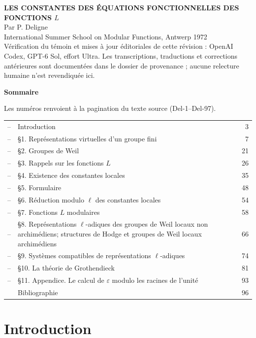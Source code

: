 \documentclass[10pt,letterpaper]{article}
\begin{document}
\begin{center}
{\Large\bfseries LES CONSTANTES DES ÉQUATIONS FONCTIONNELLES DES FONCTIONS \(L\)}\\[2em]
{\large Par P. Deligne}\\[6em]
International Summer School on Modular Functions, Antwerp 1972\\[2em]
{\small Vérification du témoin et mises à jour éditoriales de cette révision :
OpenAI Codex, GPT-6 Sol, effort Ultra. Les transcriptions, traductions et
corrections antérieures sont documentées dans le dossier de provenance ;
aucune relecture humaine n'est revendiquée ici.}
\end{center}

\newpage

\begin{center}
\bfseries Sommaire
\end{center}

\noindent Les numéros renvoient à la pagination du texte source (Del-1--Del-97).
\medskip

\noindent\begin{tabularx}{\textwidth}{@{}p{}Xr@{}}
--& Introduction & 3\\
--& \S1. Représentations virtuelles d'un groupe fini & 7\\
--& \S2. Groupes de Weil & 21\\
--& \S3. Rappels sur les fonctions \(L\) & 26\\
--& \S4. Existence des constantes locales & 35\\
--& \S5. Formulaire & 48\\
--& \S6. Réduction modulo \(\ell\) des constantes locales & 54\\
--& \S7. Fonctions \(L\) modulaires & 58\\
--& \S8. Représentations \(\ell\)-adiques des groupes de Weil locaux non archimédiens; structures de Hodge et groupes de Weil locaux archimédiens & 66\\
--& \S9. Systèmes compatibles de représentations \(\ell\)-adiques & 74\\
--& \S10. La théorie de Grothendieck & 81\\
--& \S11. Appendice. Le calcul de \(\varepsilon\) modulo les racines de l'unité & 93\\
& Bibliographie & 96
\end{tabularx}

\newpage

\section*{Introduction}
\end{document}
